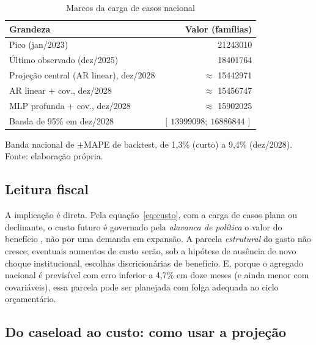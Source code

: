 \documentclass[12pt,a4paper,oneside]{article}
\begin{document}
\begin{table}[H]
\centering
\caption{Marcos da carga de casos nacional}
\label{tab:projecao}
\small
\begin{tabular}{@{}lr@{}}
\toprule
\textbf{Grandeza} & \textbf{Valor (famílias)} \\
\midrule
Pico (jan/2023)                                  & \num{21243010} \\
Último observado (dez/2025)                        & \num{18401764} \\
Projeção central (AR linear), dez/2028            & $\approx$ \num{15442971} \\
AR linear + cov., dez/2028                         & $\approx$ \num{15456747} \\
MLP profunda + cov., dez/2028                       & $\approx$ \num{15902025} \\
Banda de 95\% em dez/2028                           & $[\,\num{13999098};\ \num{16886844}\,]$ \\
\bottomrule
\end{tabular}
\par\smallskip
{\footnotesize Banda nacional de $\pm$MAPE de backtest, de 1,3\% (curto) a
9,4\% (dez/2028). Fonte: elaboração própria.}
\end{table}

\subsection{Leitura fiscal}

A implicação é direta. Pela equação~\eqref{eq:custo}, com a carga de casos
plana ou declinante, o custo futuro é governado pela \emph{alavanca de
política} \textemdash{} o valor do benefício \textemdash{}, não por uma
demanda em expansão. A parcela \emph{estrutural} do gasto não cresce;
eventuais aumentos de custo serão, sob a hipótese de ausência de novo
choque institucional, escolhas discricionárias de benefício. E, porque o
agregado nacional é previsível com erro inferior a 4,7\% em doze meses
(e ainda menor com covariáveis), essa parcela pode ser planejada com folga
adequada ao ciclo orçamentário.

\subsection{Do caseload ao custo: como usar a projeção}
\end{document}
